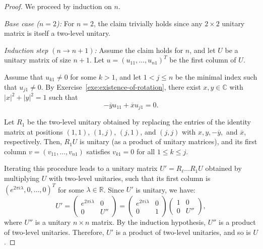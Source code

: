 \documentclass[a4paper, oneside, 12pt]{amsart}
\begin{document}
\begin{proof}
  We proceed by induction on \( n \).

  \textit{Base case (\( n = 2 \)):}
  For \( n = 2 \), the claim trivially holds since any \( 2 \times 2 \) unitary matrix is itself a two-level unitary.

  \textit{Induction step \((n\to n+1)\):}
  Assume the claim holds for \( n \), and let \( U \) be a unitary matrix of size \( n+1 \).
  Let \( u = (u_{11}, \dots, u_{n1})^T \) be the first column of \( U \).

  Assume that \( u_{k1} \neq 0 \) for some \( k > 1 \), and let \( 1 < j \leq n \) be the minimal index such that \( u_{j1} \neq 0 \).
  By Exercise~\ref{exe:existence-of-rotation}, there exist \( x, y \in \mathbb{C} \) with \( |x|^2 + |y|^2 = 1 \) such that
  \begin{equation*}
    - \overline{y} u_{11} + \overline{x} u_{j1} = 0.
  \end{equation*}

  Let \( R_{1} \) be the two-level unitary obtained by replacing the entries of the identity matrix at positions \( (1,1) \), \( (1,j) \), \( (j,1) \), and \( (j,j) \) with \( x, y, -\overline{y}, \) and \( \overline{x} \), respectively.
  Then, \( R_{1}U \) is unitary (as a product of unitary matrices), and its first column \( v = (v_{11}, \dots, v_{n1}) \) satisfies \( v_{k1} = 0 \) for all \( 1 \leq k \leq j \).

  Iterating this procedure leads to a unitary matrix \( U' = R_\ell \dots R_1 U \) obtained by multiplying \( U \) with two-level unitaries, such that its first column is \( (e^{2\pi i \lambda}, 0, \dots, 0)^T \) for some \( \lambda \in \mathbb{R} \).
  Since \( U' \) is unitary, we have:
  \begin{equation*}
    U' =
    \begin{pmatrix}
      e^{2\pi i \lambda} & 0 \\
      0 & U''
    \end{pmatrix} =
    \begin{pmatrix}
      e^{2\pi i \lambda} & 0 \\
      0 & 1
    \end{pmatrix}
    \begin{pmatrix}
      1 & 0 \\
      0 & U''
    \end{pmatrix},
  \end{equation*}
  where \( U'' \) is a unitary \( n \times n \) matrix.
  By the induction hypothesis, \( U'' \) is a product of two-level unitaries. Therefore, \( U' \) is a product of two-level unitaries, and so is \( U \).
\end{proof}
\end{document}
